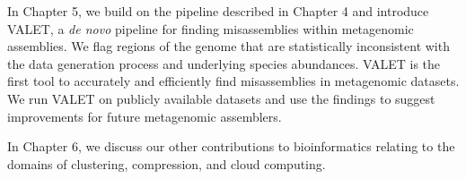 In Chapter 5, we build on the pipeline described in Chapter 4 and introduce VALET, a \emph{de novo} pipeline for finding mis­assemblies within metagenomic assemblies.
We flag regions of the genome that are statistically inconsistent with the data generation process and underlying species abundances.
VALET is the first tool to accurately and efficiently find mis­assemblies in metagenomic datasets.
We run VALET on publicly available datasets and use the findings to suggest improvements for future metagenomic assemblers.

In Chapter 6, we discuss our other contributions to bioinformatics relating to the domains of clustering, compression, and cloud computing.
